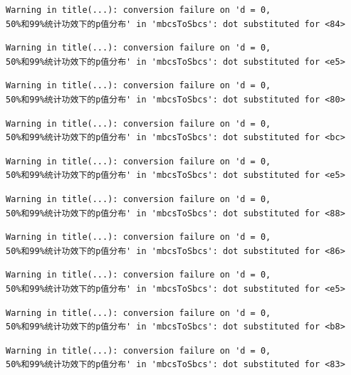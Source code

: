 \documentclass[
  letterpaper,
  DIV=11,
  numbers=noendperiod]{scrreprt}
\begin{document}
\begin{verbatim}
Warning in title(...): conversion failure on 'd = 0,
50%和99%统计功效下的p值分布' in 'mbcsToSbcs': dot substituted for <84>
\end{verbatim}

\begin{verbatim}
Warning in title(...): conversion failure on 'd = 0,
50%和99%统计功效下的p值分布' in 'mbcsToSbcs': dot substituted for <e5>
\end{verbatim}

\begin{verbatim}
Warning in title(...): conversion failure on 'd = 0,
50%和99%统计功效下的p值分布' in 'mbcsToSbcs': dot substituted for <80>
\end{verbatim}

\begin{verbatim}
Warning in title(...): conversion failure on 'd = 0,
50%和99%统计功效下的p值分布' in 'mbcsToSbcs': dot substituted for <bc>
\end{verbatim}

\begin{verbatim}
Warning in title(...): conversion failure on 'd = 0,
50%和99%统计功效下的p值分布' in 'mbcsToSbcs': dot substituted for <e5>
\end{verbatim}

\begin{verbatim}
Warning in title(...): conversion failure on 'd = 0,
50%和99%统计功效下的p值分布' in 'mbcsToSbcs': dot substituted for <88>
\end{verbatim}

\begin{verbatim}
Warning in title(...): conversion failure on 'd = 0,
50%和99%统计功效下的p值分布' in 'mbcsToSbcs': dot substituted for <86>
\end{verbatim}

\begin{verbatim}
Warning in title(...): conversion failure on 'd = 0,
50%和99%统计功效下的p值分布' in 'mbcsToSbcs': dot substituted for <e5>
\end{verbatim}

\begin{verbatim}
Warning in title(...): conversion failure on 'd = 0,
50%和99%统计功效下的p值分布' in 'mbcsToSbcs': dot substituted for <b8>
\end{verbatim}

\begin{verbatim}
Warning in title(...): conversion failure on 'd = 0,
50%和99%统计功效下的p值分布' in 'mbcsToSbcs': dot substituted for <83>
\end{verbatim}
\end{document}
